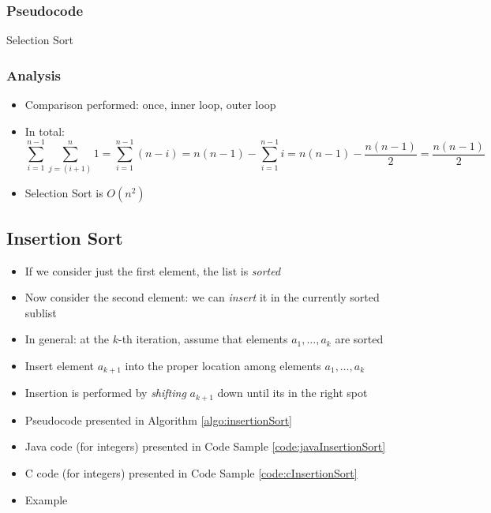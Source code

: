 \subsubsection{Pseudocode}

    \begin{algorithm}[H]
    \caption{Selection Sort}
    \label{algo:selectionSort}
    \end{algorithm}

\subsubsection{Analysis}

\begin{itemize}
  \item Comparison performed: once, inner loop, outer loop
  \item In total:
    $$\sum_{i=1}^{n-1} \sum_{j=(i+1)}^{n} 1 = \sum_{i=1}^{n-1} (n - i) = n(n-1) - \sum_{i=1}^{n-1} i =  n(n-1) - \frac{n(n-1)}{2} =  \frac{n(n-1)}{2}$$
  \item Selection Sort is $O(n^2)$
\end{itemize}

\subsection{Insertion Sort}

\begin{itemize}
  \item If we consider just the first element, the list is \emph{sorted}
  \item Now consider the second element: we can \emph{insert} it in the currently sorted sublist
  \item In general: at the $k$-th iteration, assume that elements $a_1, \ldots, a_k$ are sorted
  \item Insert element $a_{k+1}$ into the proper location among elements $a_1, \ldots, a_k$
  \item Insertion is performed by \emph{shifting} $a_{k+1}$ down until its in the right spot
  \item Pseudocode presented in Algorithm \ref{algo:insertionSort}
  \item Java code (for integers) presented in Code Sample \ref{code:javaInsertionSort}
  \item C code (for integers) presented in Code Sample \ref{code:cInsertionSort}
  \item Example
\end{itemize}

